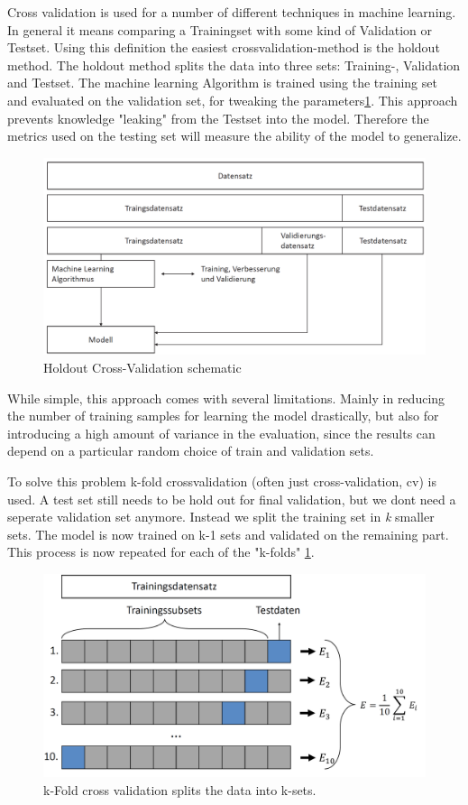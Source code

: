\begin{questions}
Cross validation is used for a number of different techniques in machine learning. In general it means comparing a Trainingset with some kind of Validation or Testset. Using this definition the easiest crossvalidation-method is the holdout method. The holdout method splits the data into three sets: Training-, Validation and Testset. The machine learning Algorithm is trained using the training set and evaluated on the validation set, for tweaking the parameters\ref{fig:holdout}. This approach prevents knowledge "leaking" from the Testset into the model. Therefore the metrics used on the testing set will measure the ability of the model to generalize. 
\begin{figure}[H]
	\includegraphics[width=0.7\linewidth]{pictures/holdout.png}
	\centering
	\caption{Holdout Cross-Validation schematic}
	\label{fig:holdout}
\end{figure}



While simple, this approach comes with several limitations. Mainly in reducing the number of training samples for learning the model drastically, but also for introducing a high amount of variance in the evaluation, since the results can depend on a particular random choice of train and validation sets. 

To solve this problem k-fold crossvalidation (often just cross-validation, cv) is used. A test set still needs to be hold out for final validation, but we dont need a seperate validation set anymore. Instead we split the training set in \textit{k} smaller sets. The model is now trained on k-1 sets and validated on the remaining part. This process is now repeated for each of the "k-folds" \ref{fig:holdout}.

\begin{figure}[H]
	\includegraphics[width=0.7\linewidth]{pictures/cross_validation.png}
	\centering
	\caption{k-Fold cross validation splits the data into k-sets.}
	\label{fig:cv}
\end{figure}


\end{questions}
